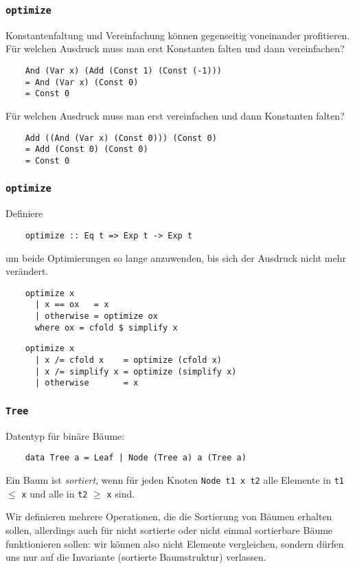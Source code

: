 \documentclass{beamer}
\begin{document}
\begin{frame}[fragile]
  \frametitle{\lstinline{optimize}}
  Konstantenfaltung und Vereinfachung können gegenseitig voneinander profitieren.
  Für welchen Ausdruck muss man erst Konstanten falten und dann vereinfachen?
  \pause
  \begin{lstlisting}
    And (Var x) (Add (Const 1) (Const (-1)))
    = And (Var x) (Const 0)
    = Const 0
  \end{lstlisting}
  \pause
  Für welchen Ausdruck muss man erst vereinfachen und dann Konstanten falten?
  \pause
  \begin{lstlisting}
    Add ((And (Var x) (Const 0))) (Const 0)
    = Add (Const 0) (Const 0)
    = Const 0
  \end{lstlisting}
\end{frame}

\begin{frame}[fragile]
  \frametitle{\lstinline{optimize}}
  Definiere
  \begin{lstlisting}
    optimize :: Eq t => Exp t -> Exp t
  \end{lstlisting}
  um beide Optimierungen so lange anzuwenden, bis sich der Ausdruck nicht mehr verändert.
  \pause
  \begin{lstlisting}
    optimize x
      | x == ox   = x
      | otherwise = optimize ox
      where ox = cfold $ simplify x
  \end{lstlisting}
  \begin{lstlisting}
    optimize x
      | x /= cfold x    = optimize (cfold x)
      | x /= simplify x = optimize (simplify x)
      | otherwise       = x
  \end{lstlisting}
\end{frame}

\begin{frame}[fragile]
  \frametitle{\lstinline{Tree}}
  Datentyp für binäre Bäume:
  \begin{lstlisting}
    data Tree a = Leaf | Node (Tree a) a (Tree a)
  \end{lstlisting}
  Ein Baum ist \emph{sortiert}, wenn für jeden Knoten \lstinline{Node t1 x t2}
  alle Elemente in \lstinline{t1} $≤$ \lstinline{x} und alle in \lstinline{t2} $≥$ \lstinline{x} sind.
  
  Wir definieren mehrere Operationen, die die Sortierung von Bäumen erhalten sollen,
  allerdings auch für nicht sortierte oder nicht einmal sortierbare Bäume funktionieren sollen:
  wir können also nicht Elemente vergleichen,
  sondern dürfen uns nur auf die Invariante (sortierte Baumstruktur) verlassen.
\end{frame}
\end{document}
